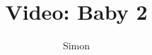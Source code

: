 \documentclass[a4paper,11pt]{article}
\title{Video: Baby 2}
\author{Simon}
\begin{document}
\maketitle

\begin{sketch}


\end{sketch}
\end{document}
